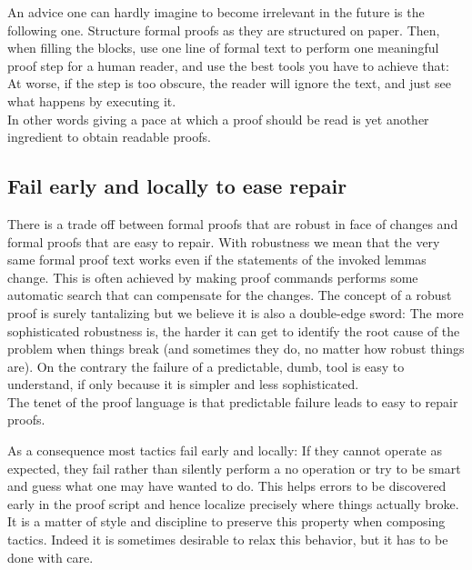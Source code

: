 An advice one can hardly imagine to become irrelevant in the future
is the following one. Structure formal proofs as they are structured on paper.
Then, when filling the blocks, use one line of formal text to perform one
meaningful proof step for a human reader, and use the best tools you have to
achieve that: At worse, if the step is too obscure, the reader will ignore the text, and just see what happens by executing it.\\
In other words giving a pace at which a proof should be read is yet
another ingredient to obtain readable proofs.

\subsection{Fail early and locally to ease repair}

There is a trade off between formal proofs that are robust in face of
changes and formal proofs that are easy to repair. 
With robustness we mean that the very same formal proof text
works even if the statements of the invoked lemmas change.
This is often achieved by making proof commands performs some automatic
search that can compensate for the changes.
The concept of a robust proof is surely tantalizing but we
believe it is also a double-edge sword: The more
sophisticated robustness is, the harder it can get to identify the
root cause of the problem when things break (and sometimes they do, no
matter how robust things are).  On the
contrary the failure of a predictable, dumb, tool is easy
to understand, if only because it is simpler and less
sophisticated.\\
The tenet of the \mcbSSR{} proof language is that
predictable failure leads to easy to repair proofs.

As a consequence most \mcbSSR{} tactics fail early and locally: If they cannot
operate as expected, they fail rather than silently perform a no
operation or try to be smart and guess what one may have wanted to
do.  This helps errors to be discovered early in the proof script and
hence localize precisely where things actually broke. It is a matter
of style and discipline to preserve this property when composing
\mcbSSR{} tactics.  Indeed it is sometimes desirable to relax this
behavior, but it has to be done with care.


